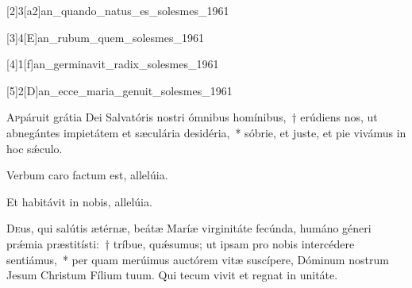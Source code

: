 \documentclass[vesperale_romanum.tex]{subfiles}
\begin{document}



[2]{3}[a2]{an_quando_natus_es_solesmes_1961}



[3]{4}[E]{an_rubum_quem_solesmes_1961}


[4]{1}[f]{an_germinavit_radix_solesmes_1961}


[5]{2}[D]{an_ecce_maria_genuit_solesmes_1961}





\lettrine{A}{p}páruit grátia Dei Salvatóris nostri ómnibus homínibus,~† erúdiens nos, ut abnegántes impietátem et sæculária desidéria,~* sóbrie, et juste, et pie vivámus in hoc sǽculo.


\vv Verbum caro factum est, allelúia.

\rr Et habitávit in nobis, allelúia.


 \label{or_jan_1}
 
\oratio

\lettrine{D}{e}us, qui salútis ætérnæ, beátæ Maríæ virginitáte fecúnda, humáno géneri prǽmia præstitísti:~† tríbue, quǽsumus; ut i\-psam pro nobis intercédere sentiámus,~* per quam merúimus auctórem vitæ suscípere, Dóminum nostrum Jesum Christum Fílium tuum.
Qui tecum vivit et regnat in unitáte.
\end{document}
